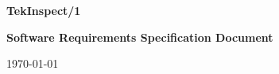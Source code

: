 
\begin{titlepage}
\begin{center}
  
  \vspace{1.5in}
  
  {\Large\bf TekInspect/1}
  
  \vspace{0.5in}
  
  {\large\bf Software Requirements Specification Document}
  
  \vspace{0.5in}
  
 
  \today
  
\end{center}
\end{titlepage}
